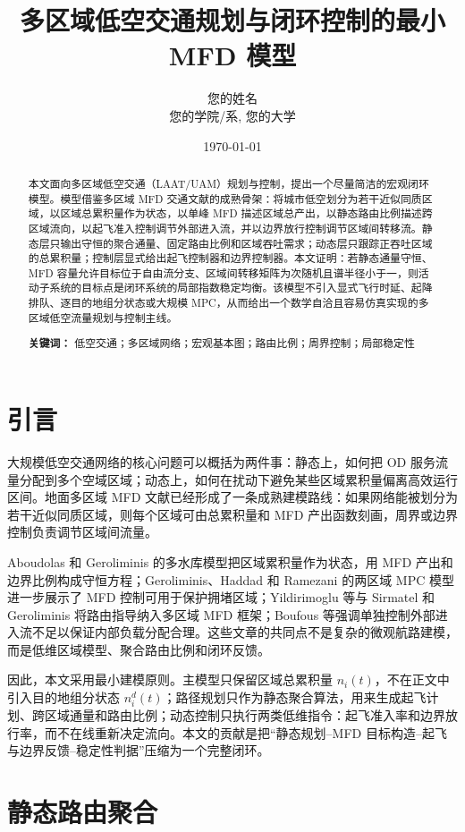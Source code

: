 \documentclass[a4paper,12pt]{article}
\title{\textbf{多区域低空交通规划与闭环控制的最小 MFD 模型}}
\author{您的姓名 \\ 您的学院/系, 您的大学}
\date{\today}
\theoremstyle{plain}
\theoremstyle{definition}
\theoremstyle{remark}
\begin{document}
\maketitle

\begin{abstract}
本文面向多区域低空交通（LAAT/UAM）规划与控制，提出一个尽量简洁的宏观闭环模型。模型借鉴多区域 MFD 交通文献的成熟骨架：将城市低空划分为若干近似同质区域，以区域总累积量作为状态，以单峰 MFD 描述区域总产出，以静态路由比例描述跨区域流向，以起飞准入控制调节外部进入流，并以边界放行控制调节区域间转移流。静态层只输出守恒的聚合通量、固定路由比例和区域吞吐需求；动态层只跟踪正吞吐区域的总累积量；控制层显式给出起飞控制器和边界控制器。本文证明：若静态通量守恒、MFD 容量允许目标位于自由流分支、区域间转移矩阵为次随机且谱半径小于一，则活动子系统的目标点是闭环系统的局部指数稳定均衡。该模型不引入显式飞行时延、起降排队、逐目的地组分状态或大规模 MPC，从而给出一个数学自洽且容易仿真实现的多区域低空流量规划与控制主线。

\textbf{关键词：} 低空交通；多区域网络；宏观基本图；路由比例；周界控制；局部稳定性
\end{abstract}

\section{引言}

大规模低空交通网络的核心问题可以概括为两件事：静态上，如何把 OD 服务流量分配到多个空域区域；动态上，如何在扰动下避免某些区域累积量偏离高效运行区间。地面多区域 MFD 文献已经形成了一条成熟建模路线：如果网络能被划分为若干近似同质区域，则每个区域可由总累积量和 MFD 产出函数刻画，周界或边界控制负责调节区域间流量。

Aboudolas 和 Geroliminis 的多水库模型把区域累积量作为状态，用 MFD 产出和边界比例构成守恒方程；Geroliminis、Haddad 和 Ramezani 的两区域 MPC 模型进一步展示了 MFD 控制可用于保护拥堵区域；Yildirimoglu 等与 Sirmatel 和 Geroliminis 将路由指导纳入多区域 MFD 框架；Boufous 等强调单独控制外部进入流不足以保证内部负载分配合理。这些文章的共同点不是复杂的微观航路建模，而是低维区域模型、聚合路由比例和闭环反馈。

因此，本文采用最小建模原则。主模型只保留区域总累积量 $n_i(t)$，不在正文中引入目的地组分状态 $n_i^d(t)$；路径规划只作为静态聚合算法，用来生成起飞计划、跨区域通量和路由比例；动态控制只执行两类低维指令：起飞准入率和边界放行率，而不在线重新决定流向。本文的贡献是把“静态规划--MFD 目标构造--起飞与边界反馈--稳定性判据”压缩为一个完整闭环。

\section{静态路由聚合}
\end{document}
